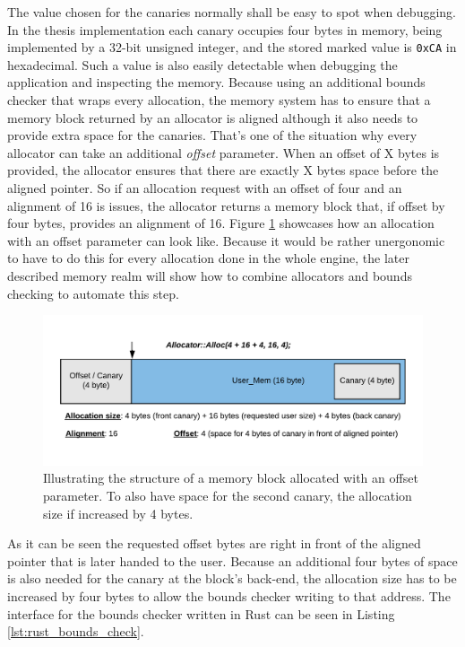 \noindent
The value chosen for the canaries normally shall be easy to spot when debugging. In the thesis implementation each canary occupies four bytes in memory, being implemented by a 32-bit unsigned integer, and the stored marked value is \texttt{0xCA} in hexadecimal. Such a value is also easily detectable when debugging the application and inspecting the memory. Because using an additional bounds checker that wraps every allocation, the memory system has to ensure that a memory block returned by an allocator is aligned although it also needs to provide extra space for the canaries. That's one of the situation why every allocator can take an additional \textit{offset} parameter. When an offset of X bytes is provided, the allocator ensures that there are exactly X bytes space before the aligned pointer. So if an allocation request with an offset of four and an alignment of 16 is issues, the allocator returns a memory block that, if offset by four bytes, provides an alignment of 16. Figure \ref{fig:offset_alloc} showcases how an allocation with an offset parameter can look like. Because it would be rather unergonomic to have to do this for every allocation done in the whole engine, the later described memory realm will show how to combine allocators and bounds checking to automate this step.

\clearpage

\begin{figure}[h!]
	\centering \includegraphics[width=\linewidth]{PICs/offset_alloc.png}
	\caption{Illustrating the structure of a memory block allocated with an offset parameter. To also have space for the second canary, the allocation size if increased by 4 bytes.}
	\label{fig:offset_alloc}
\end{figure}

\noindent
As it can be seen the requested offset bytes are right in front of the aligned pointer that is later handed to the user. Because an additional four bytes of space is also needed for the canary at the block's back-end, the allocation size has to be increased by four bytes to allow the bounds checker writing to that address. The interface for the bounds checker written in Rust can be seen in Listing \ref{lst:rust_bounds_check}.\\

